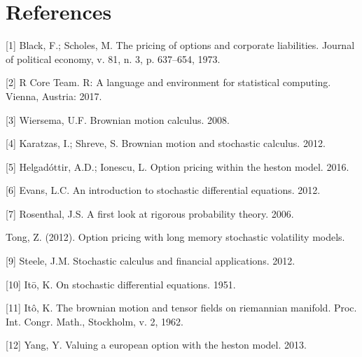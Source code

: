 \documentclass[12pt,twoside]{reedthesis}
\theoremstyle{definition}
\theoremstyle{definition}
\theoremstyle{remark}
\begin{document}
  \clearpage
  
   \fancyhead[R]{\slshape }
  
  \backmatter
  
  \chapter*{References}\label{references}
  
  \setlength{\parindent}{-0.0in} \setlength{\leftskip}{0.00in}
  \setlength{\parskip}{6pt}
  
  \hypertarget{refs}{}
  \hypertarget{ref-black1973pricing}{}
  {[}1{]} Black, F.; Scholes, M. The pricing of options and corporate
  liabilities. Journal of political economy, v. 81, n. 3, p. 637--654,
  1973.
  
  \hypertarget{ref-rlang}{}
  {[}2{]} R Core Team. R: A language and environment for statistical
  computing. Vienna, Austria: 2017.
  
  \hypertarget{ref-ubbo}{}
  {[}3{]} Wiersema, U.F. Brownian motion calculus. 2008.
  
  \hypertarget{ref-karatzas2012brownian}{}
  {[}4{]} Karatzas, I.; Shreve, S. Brownian motion and stochastic
  calculus. 2012.
  
  \hypertarget{ref-helgadottir2016option}{}
  {[}5{]} Helgadóttir, A.D.; Ionescu, L. Option pricing within the heston
  model. 2016.
  
  \hypertarget{ref-evans}{}
  {[}6{]} Evans, L.C. An introduction to stochastic differential
  equations. 2012.
  
  \hypertarget{ref-rosenthal}{}
  {[}7{]} Rosenthal, J.S. A first look at rigorous probability theory.
  2006.
  
  \hypertarget{ref-tong2012option}{}
  Tong, Z. (2012). Option pricing with long memory stochastic volatility
  models.
  
  \hypertarget{ref-steele2012stochastic}{}
  {[}9{]} Steele, J.M. Stochastic calculus and financial applications.
  2012.
  
  \hypertarget{ref-ito1951}{}
  {[}10{]} Itō, K. On stochastic differential equations. 1951.
  
  \hypertarget{ref-ito1962}{}
  {[}11{]} Itô, K. The brownian motion and tensor fields on riemannian
  manifold. Proc. Int. Congr. Math., Stockholm, v. 2, 1962.
  
  \hypertarget{ref-yang2013valuing}{}
  {[}12{]} Yang, Y. Valuing a european option with the heston model. 2013.
  
\end{document}
